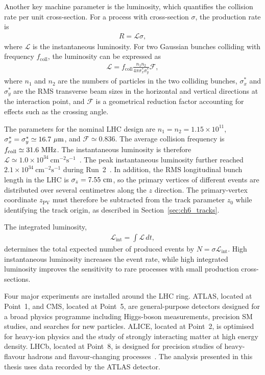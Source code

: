 Another key machine parameter is the luminosity, which quantifies the collision rate per unit cross-section.
For a process with cross-section $\sigma$, the production rate is
\begin{align*}
    R = \mathcal{L}\sigma,
\end{align*}
where $\mathcal{L}$ is the instantaneous luminosity.
For two Gaussian bunches colliding with frequency $f_{\mathrm{coll}}$, the luminosity can be expressed as~\cite{Evans2008LHC}
\begin{align*}
    \mathcal{L}
    =
    f_{\mathrm{coll}}
    \frac{n_{1}n_{2}}
    {4\pi\sigma^{*}_{x}\sigma^{*}_{y}}
    \mathcal{F},
\end{align*}
where $n_{1}$ and $n_{2}$ are the numbers of particles in the two colliding bunches, $\sigma^{*}_{x}$ and $\sigma^{*}_{y}$ are the RMS transverse beam sizes in the horizontal and vertical directions at the interaction point, and $\mathcal{F}$ is a geometrical reduction factor accounting for effects such as the crossing angle.

The parameters for the nominal LHC design are $n_1=n_2=1.15\times10^{11}$, $\sigma_x^*=\sigma_y^*\simeq16.7~\mu\mathrm{m}$, and $\mathcal{F}\simeq0.836$.
The average collision frequency is $f_{\mathrm{coll}}\simeq31.6~\mathrm{MHz}$. The instantaneous luminosity is therefore $\mathcal{L}\simeq1.0\times10^{34}~\mathrm{cm}^{-2}\mathrm{s}^{-1}$~\cite{Matis2017BRAN}. 
The peak instantaneous luminosity further reached $2.1\times10^{34}~\mathrm{cm}^{-2}\mathrm{s}^{-1}$ during Run~2~\cite{Steerenberg2019LHCRun2}.
In addition, the RMS longitudinal bunch length in the LHC is $\sigma_z=7.55~\mathrm{cm}$, so the primary vertices of different events are distributed over several centimetres along the $z$ direction.
The primary-vertex coordinate $z_{\mathrm{PV}}$ must therefore be subtracted from the track parameter $z_0$ while identifying the track origin, as described in Section~\ref{sec:ch6_tracks}.

The integrated luminosity,
\begin{align*}
    \mathcal{L}_{\mathrm{int}}
    =
    \int \mathcal{L}\,dt,
\end{align*}
determines the total expected number of produced events by $N=\sigma\mathcal{L}_{\mathrm{int}}$.
High instantaneous luminosity increases the event rate, while high integrated luminosity improves the sensitivity to rare processes with small production cross-sections.

Four major experiments are installed around the LHC ring.
ATLAS, located at Point~1, and CMS, located at Point~5, are general-purpose detectors designed for a broad physics programme including Higgs-boson measurements, precision SM studies, and searches for new particles.
ALICE, located at Point~2, is optimised for heavy-ion physics and the study of strongly interacting matter at high energy density.
LHCb, located at Point~8, is designed for precision studies of heavy-flavour hadrons and flavour-changing processes~\cite{Evans2008LHC}.
The analysis presented in this thesis uses data recorded by the ATLAS detector.

